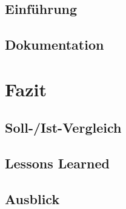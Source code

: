 \section{Einführung}
\section{Dokumentation}

\chapter{Fazit}
\section{Soll-/Ist-Vergleich}
\section{Lessons Learned}
\section{Ausblick}

